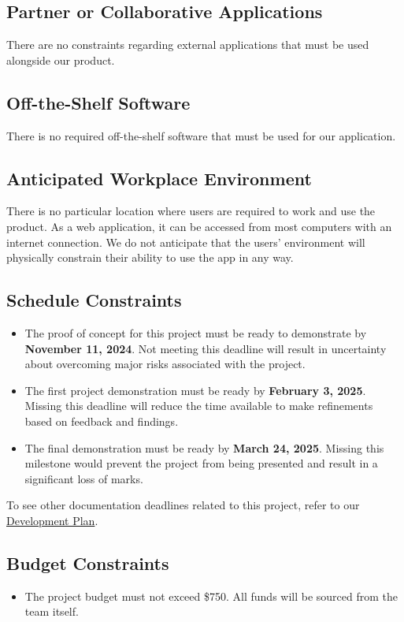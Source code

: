 \documentclass[12pt]{article}
\begin{document}
\subsection{Partner or Collaborative Applications}
There are no constraints regarding external applications that must be used alongside our product.
\subsection{Off-the-Shelf Software}
There is no required off-the-shelf software that must be used for our application.
\subsection{Anticipated Workplace Environment}
There is no particular location where users are required to work and use the product. As a web application, it can be accessed from most computers with an internet connection. We do not anticipate that the users' environment will physically constrain their ability to use the app in any way.
\subsection{Schedule Constraints}
\begin{itemize}
  \item The proof of concept for this project must be ready to demonstrate by \textbf{November 11, 2024}. Not meeting this deadline will result in uncertainty about overcoming major risks associated with the project.
  \item The first project demonstration must be ready by \textbf{February 3, 2025}. Missing this deadline will reduce the time available to make refinements based on feedback and findings.
  \item The final demonstration must be ready by \textbf{March 24, 2025}. Missing this milestone would prevent the project from being presented and result in a significant loss of marks.
\end{itemize}
To see other documentation deadlines related to this project, refer to our \href{https://github.com/OKKM-insights/OKKM.insights/blob/main/docs/DevelopmentPlan/DevelopmentPlan.pdf}{Development Plan}. 
\subsection{Budget Constraints}
\begin{itemize}
  \item The project budget must not exceed \$750. All funds will be sourced from the team itself.
\end{itemize}
\end{document}
